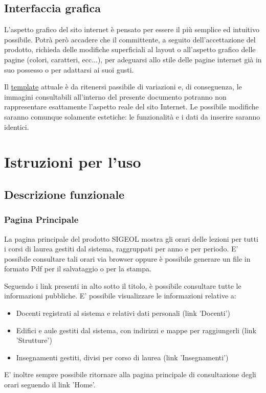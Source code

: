 \documentclass[11pt,a4paper]{article}
\begin{document}
\subsection{Interfaccia grafica}
L'aspetto grafico del sito internet è pensato per essere il più semplice ed intuitivo possibile. Potrà però accadere che il committente, a seguito dell'accettazione del prodotto, richieda delle modifiche superficiali al layout o all'aspetto grafico delle pagine (colori, caratteri, ecc...), per adeguarsi allo stile delle pagine internet già in suo possesso o per adattarsi ai suoi gusti.

Il \underline{template} attuale è da ritenersi passibile di variazioni e, di conseguenza, le immagini consultabili all'interno del presente documento potranno non rappresentare esattamente l'aspetto reale del sito Internet. Le possibile modifiche saranno comunque solamente estetiche: le funzionalità e i dati da inserire saranno identici.
\section{Istruzioni per l'uso}
\subsection{Descrizione funzionale}
\subsubsection{Pagina Principale}
La pagina principale del prodotto SIGEOL mostra gli orari delle lezioni per tutti i corsi di laurea gestiti dal sistema, raggruppati per anno e per periodo. E' possibile consultare tali orari via browser oppure è possibile generare un file in formato Pdf per il salvataggio o per la stampa.

Seguendo i link presenti in alto sotto il titolo, è possibile consultare tutte le informazioni pubbliche. E' possibile visualizzare le informazioni relative a:
\begin{itemize}
 \item Docenti registrati al sistema e relativi dati personali (link 'Docenti')
 \item Edifici e aule gestiti dal sistema, con indirizzi e mappe per raggiungerli (link 'Strutture')
 \item Insegnamenti gestiti, divisi per corso di laurea (link 'Insegnamenti')
\end{itemize}

E' inoltre sempre possibile ritornare alla pagina principale di consultazione degli orari seguendo il link 'Home'.
\end{document}
